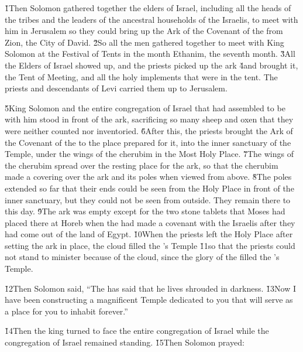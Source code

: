 \v{1}Then Solomon gathered together the elders of Israel, including all the heads of the tribes and the leaders of the ancestral households of the Israelis, to meet with him in Jerusalem so they could bring up the Ark of the Covenant of the  from Zion, the City of David. \v{2}So all the men gathered together to meet with King Solomon at the Festival of Tents in the month Ethanim, the seventh month. \v{3}All the Elders of Israel showed up, and the priests picked up the ark \v{4}and brought it, the Tent of Meeting, and all the holy implements that were in the tent. The priests and descendants of Levi carried them up to Jerusalem.

\v{5}King Solomon and the entire congregation of Israel that had assembled to be with him stood in front of the ark, sacrificing so many sheep and oxen that they were neither counted nor inventoried. \v{6}After this, the priests brought the Ark of the Covenant of the  to the place prepared for it, into the inner sanctuary of the Temple, under the wings of the cherubim in the Most Holy Place. \v{7}The wings of the cherubim spread over the resting place for the ark, so that the cherubim made a covering over the ark and its poles when viewed from above. \v{8}The poles extended so far that their ends could be seen from the Holy Place in front of the inner sanctuary, but they could not be seen from outside. They remain there to this day. \v{9}The ark was empty except for the two stone tablets that Moses had placed there at Horeb when the  had made a covenant with the Israelis after they had come out of the land of Egypt. \v{10}When the priests left the Holy Place after setting the ark in place, the cloud filled the 's Temple \v{11}so that the priests could not stand to minister because of the cloud, since the glory of the  filled the 's Temple.

\v{12}Then Solomon said, ``The  has said that he lives shrouded in darkness. \v{13}Now I have been constructing a magnificent Temple dedicated to you that will serve as a place for you to inhabit forever.''

\v{14}Then the king turned to face the entire congregation of Israel while the congregation of Israel remained standing. \v{15}Then Solomon prayed:

